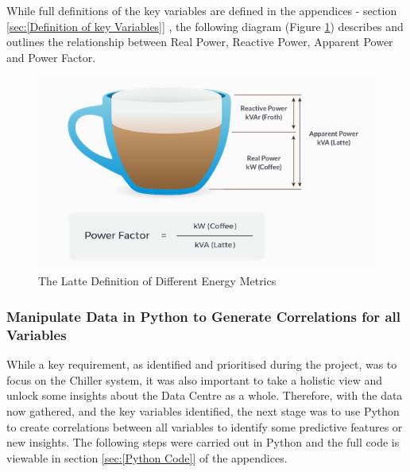 \documentclass[12pt]{scrartcl}
\begin{document}
While full definitions of the key variables are defined in the appendices - section \ref{sec:[Definition of key Variables]} , the following diagram (Figure \ref{fig:coffeeenergyanaliogy}) describes and outlines the relationship between Real Power, Reactive Power, Apparent Power and Power Factor. 

\begin{figure}[H]
  \caption{The Latte Definition of Different Energy Metrics}
  \label{fig:coffeeenergyanaliogy}
  \centering
    \includegraphics[scale=0.50]{power_explanation}
\end{figure} 

\subsubsection{Manipulate Data in Python to Generate Correlations for all Variables}
\label{subsubsec:[Manipulate Data in Python to Generate Correlations for all Variables]}

While a key requirement, as identified and prioritised during the project, was to focus on the Chiller system, it was also important to take a holistic view and unlock some insights about the Data Centre as a whole. Therefore, with the data now gathered, and the key variables identified, the next stage was to use Python to create correlations between all variables to identify some predictive features or new insights. The following steps were carried out in Python and the full code is viewable in section \ref{sec:[Python Code]} of the appendices.
\end{document}

